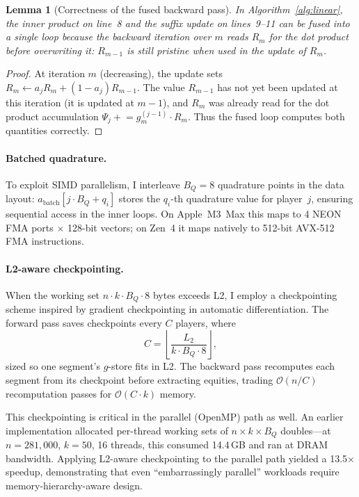 \documentclass[11pt]{article}
\newtheorem{lemma}[theorem]{Lemma}
\newcommand{\bigO}{\mathcal{O}}
\begin{document}
\begin{lemma}[Correctness of the fused backward pass]\label{lem:fused}
In Algorithm~\ref{alg:linear}, the inner product on line~8 and the suffix
update on lines~9--11 can be fused into a single loop because the backward
iteration over $m$ reads $R_m$ for the dot product before overwriting it:
$R_{m-1}$ is still pristine when used in the update of $R_m$.
\end{lemma}
\begin{proof}
At iteration $m$ (decreasing), the update sets $R_m \leftarrow a_j R_m +
(1-a_j) R_{m-1}$. The value $R_{m-1}$ has not yet been updated at this
iteration (it is updated at $m-1$), and $R_m$ was already read for the dot
product accumulation $\Psi_j \mathrel{+}= g^{(j-1)}_m \cdot R_m$. Thus the
fused loop computes both quantities correctly.
\end{proof}

\paragraph{Batched quadrature.}
To exploit SIMD parallelism, I interleave $B_Q = 8$ quadrature points
in the data layout: $a_{\text{batch}}[j \cdot B_Q + q_i]$ stores the
$q_i$-th quadrature value for player~$j$, ensuring sequential access in
the inner loops. On Apple~M3~Max this maps to 4 NEON FMA ports
$\times$ 128-bit vectors; on Zen~4 it maps natively to 512-bit AVX-512
FMA instructions.

\paragraph{L2-aware checkpointing.}
When the working set $n \cdot k \cdot B_Q \cdot 8$ bytes exceeds L2,
I employ a checkpointing scheme inspired by gradient checkpointing in
automatic differentiation. The forward pass saves checkpoints every $C$
players, where
\begin{equation}\label{eq:ckpt}
  C = \left\lfloor \frac{L_2}{k \cdot B_Q \cdot 8} \right\rfloor,
\end{equation}
sized so one segment's $g$-store fits in L2. The backward pass
recomputes each segment from its checkpoint before extracting equities,
trading $\bigO(n/C)$ recomputation passes for $\bigO(C \cdot k)$ memory.

This checkpointing is critical in the parallel (OpenMP) path as well.
An earlier implementation allocated per-thread working sets of
$n \times k \times B_Q$ doubles---at $n = 281{,}000$, $k = 50$, 16
threads, this consumed 14.4\,GB and ran at DRAM bandwidth. Applying
L2-aware checkpointing to the parallel path yielded a 13.5$\times$
speedup, demonstrating that even ``embarrassingly parallel'' workloads
require memory-hierarchy-aware design.
\end{document}
